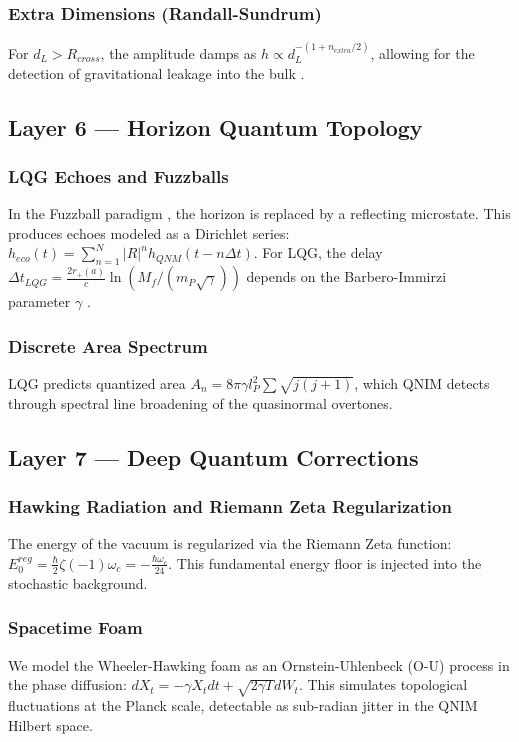 \documentclass[11pt,a4paper,spanish]{book}
\numberwithin{equation}{chapter}
\numberwithin{figure}{chapter}
\numberwithin{equation}{chapter}
\numberwithin{figure}{chapter}
\numberwithin{table}{chapter}
\begin{document}
\subsubsection{Extra Dimensions (Randall-Sundrum)}
For $d_L > R_{cross}$, the amplitude damps as $h \propto d_L^{-(1+n_{extra}/2)}$, allowing for the detection of gravitational leakage into the bulk \cite{Randall_1999}.

\subsection{Layer 6 — Horizon Quantum Topology}

\subsubsection{LQG Echoes and Fuzzballs}
In the Fuzzball paradigm \cite{Mathur_2005}, the horizon is replaced by a reflecting microstate. This produces echoes modeled as a Dirichlet series: $h_{eco}(t) = \sum_{n=1}^N |R|^n h_{QNM}(t-n\Delta t)$. For LQG, the delay $\Delta t_{LQG} = \frac{2r_+(a)}{c} \ln(M_f / (m_P \sqrt{\gamma}))$ depends on the Barbero-Immirzi parameter $\gamma$ \cite{Abedi_2017}.

\subsubsection{Discrete Area Spectrum}
LQG predicts quantized area $A_n = 8\pi \gamma l_P^2 \sum \sqrt{j(j+1)}$, which QNIM detects through spectral line broadening of the quasinormal overtones.

\subsection{Layer 7 — Deep Quantum Corrections}

\subsubsection{Hawking Radiation and Riemann Zeta Regularization}
The energy of the vacuum is regularized via the Riemann Zeta function: $E_0^{reg} = \frac{\hbar}{2}\zeta(-1)\omega_c = -\frac{\hbar\omega_c}{24}$. This fundamental energy floor is injected into the stochastic background.

\subsubsection{Spacetime Foam}
We model the Wheeler-Hawking foam as an Ornstein-Uhlenbeck (O-U) process in the phase diffusion: $dX_t = -\gamma X_t dt + \sqrt{2\gamma T} dW_t$. This simulates topological fluctuations at the Planck scale, detectable as sub-radian jitter in the QNIM Hilbert space.
\end{document}
